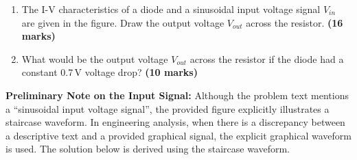 \documentclass[12pt,a3paper]{article}
\newcommand{\mk}[1]{\textcolor{orange!70!black}{\small\textbf{(#1 marks)}}}
\begin{document}
\begin{enumerate}
\begin{enumerate}
\begin{center}

\end{center}

\item The I-V characteristics of a diode and a sinusoidal input voltage signal $V_{in}$ are given in the figure. Draw the output voltage $V_{out}$ across the resistor.
\mk{16} 
\item What would be the output voltage $V_{out}$ across the resistor if the diode had a constant 0.7\,V voltage drop?
\mk{10} 

\end{enumerate}

\begin{tcolorbox}[enhanced,breakable,ansbox,colback=cA!4,colframe=cA,boxrule=0.8pt,arc=5pt,title={\textbf{Answer}},fonttitle=\bfseries\color{white},colbacktitle=cA]

\textbf{Preliminary Note on the Input Signal:} 
Although the problem text mentions a ``sinusoidal input voltage signal'', the provided figure explicitly illustrates a staircase waveform. In engineering analysis, when there is a discrepancy between a descriptive text and a provided graphical signal, the explicit graphical waveform is used. The solution below is derived using the staircase waveform.


\end{tcolorbox}
\end{enumerate}
\end{document}

